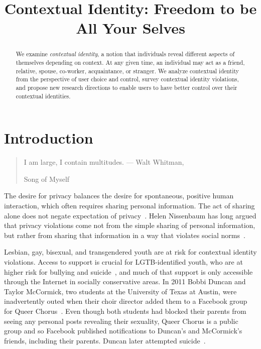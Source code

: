 \documentclass[10pt, conference, compsocconf]{IEEEtran}
\begin{document}
\title{Contextual Identity: Freedom to be All Your Selves}

\author{
}
\maketitle

\begin{abstract}
We examine \textit{contextual identity}, a notion that individuals reveal
different aspects of themselves depending on context. At any given time,
an individual may act as a friend, relative, spouse, co-worker, acquaintance, or
stranger. We analyze contextual identity from the perspective of user choice
and control, survey contextual identity violations, and propose new research
directions to enable users to have better control over their contextual
identities.
\end{abstract}

\section{Introduction}
\begin{quote}I am large, I contain multitudes. --- Walt Whitman,
\begin{em}Song of Myself\end{em} \end{quote}

The desire for privacy balances the desire for spontaneous, positive human
interaction, which often requires sharing personal information. The act of
sharing alone does not negate expectation of privacy~\cite{boyd2}.
Helen Nissenbaum has long argued that privacy violations come not from the
simple sharing of personal information, but rather from sharing that
information in a way that violates social norms~\cite{nissenbaum}.

Lesbian, gay, bisexual, and transgendered youth are at risk for contextual
identity violations.  Access to support is crucial for LGTB-identified youth,
who are at higher risk for bullying and suicide~\cite{hrc}, and
much of that support is only accessible through the Internet in socially
conservative areas. In 2011 Bobbi Duncan and Taylor McCormick, two
students at the University of Texas at Austin, were inadvertently outed when
their choir director added them to a Facebook group for Queer
Chorus~\cite{fowler}. Even though both students had blocked their parents from
seeing any personal posts revealing their sexuality, Queer Chorus is a
public group and so Facebook published notifications to Duncan's and McCormick's
friends, including their parents. Duncan later attempted suicide~\cite{duncan}.
\end{document}
